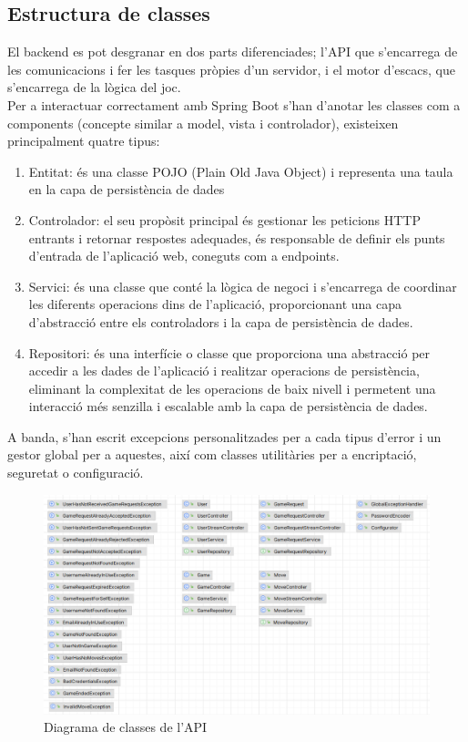 \subsection{Estructura de classes}
El backend es pot desgranar en dos parts diferenciades; l'API que s'encarrega de les comunicacions i fer les tasques pròpies d'un servidor, i el motor d'escacs, que s'encarrega de la lògica del joc.
\\[3mm]
Per a interactuar correctament amb Spring Boot s'han d'anotar les classes com a components (concepte similar a model, vista i controlador), existeixen principalment quatre tipus:
\begin{enumerate}
    \item Entitat: és una classe POJO (Plain Old Java Object) i representa una taula en la capa de persistència de dades
    \item Controlador: el seu propòsit principal és gestionar les peticions HTTP entrants i retornar respostes adequades, és responsable de definir els punts d'entrada de l'aplicació web, coneguts com a endpoints.
    \item Servici: és una classe que conté la lògica de negoci i s'encarrega de coordinar les diferents operacions dins de l'aplicació, proporcionant una capa d'abstracció entre els controladors i la capa de persistència de dades.
    \item Repositori: és una interfície o classe que proporciona una abstracció per accedir a les dades de l'aplicació i realitzar operacions de persistència, eliminant la complexitat de les operacions de baix nivell i permetent una interacció més senzilla i escalable amb la capa de persistència de dades.
\end{enumerate}
A banda, s'han escrit excepcions personalitzades per a cada tipus d'error i un gestor global per a aquestes, així com classes utilitàries per a encriptació, seguretat o configuració.
\begin{figure}[H]
    \centering
    \includegraphics[width=\textwidth]{images/api.png}
    \caption{Diagrama de classes de l'API}
    \label{fig:Diagrama de classes de l'API}
\end{figure}
